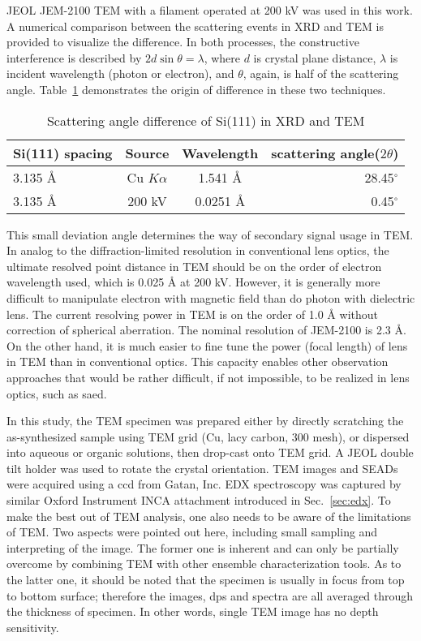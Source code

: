 JEOL JEM-2100 TEM with a  filament operated at 200 kV was used in this work. A numerical comparison between the scattering events in XRD and TEM is provided to visualize the difference. In both processes, the constructive interference is described by $2d\sin\theta = \lambda$, where $d$ is crystal plane distance, $\lambda$ is incident wavelength (photon or electron), and $\theta$, again, is half of the scattering angle. Table~\ref{tab:ch2tem} demonstrates the origin of difference in these two techniques.
\begin{table}[htb]
\centering
\caption{Scattering angle difference of Si(111) in XRD and TEM}\label{tab:ch2tem}
\begin{tabular}{lccr}
\toprule
Si(111) spacing & Source & Wavelength & scattering angle($2\theta$) \\
\midrule
3.135 \AA & Cu $K\alpha$ & 1.541 \AA & 28.45$^\circ$  \\
3.135 \AA & 200 kV & 0.0251 \si{\angstrom} & 0.45$^\circ$  \\
\bottomrule
\end{tabular}
\end{table}
This small deviation angle determines the way of secondary signal usage in TEM. In analog to the diffraction-limited resolution in conventional lens optics, the ultimate resolved point distance in TEM should be on the order of electron wavelength used, which is 0.025 \si{\angstrom} at 200 kV. However, it is generally more difficult to manipulate electron with magnetic field than do photon with dielectric lens. The current resolving power in TEM is on the order of 1.0 \si{\angstrom} without correction of spherical aberration. The nominal resolution of JEM-2100 is 2.3 \si{\angstrom}. On the other hand, it is much easier to fine tune the power (focal length) of lens in TEM than in conventional optics. This capacity enables other observation approaches that would be rather difficult, if not impossible, to be realized in lens optics, such as \gls{saed}. 

In this study, the TEM specimen was prepared either by directly scratching the as-synthesized sample using TEM grid (Cu, lacy carbon, 300 mesh), or dispersed into aqueous or organic solutions, then drop-cast onto TEM grid. A JEOL double tilt holder was used to rotate the crystal orientation. TEM images and SEADs were acquired using a \gls{ccd} from Gatan, Inc. EDX spectroscopy was captured by similar Oxford Instrument INCA attachment introduced in Sec.~\ref{sec:edx}. To make the best out of TEM analysis, one also needs to be aware of the limitations of TEM. Two aspects were pointed out here, including small sampling and interpreting of the image. The former one is inherent and can only be partially overcome by combining TEM with other ensemble characterization tools. As to the latter one, it should be noted that the specimen is usually in focus from top to bottom surface; therefore the images, \glspl{dp} and spectra are all averaged through the thickness of specimen. In other words, single TEM image has no depth sensitivity.\cite{Williams2009}  

